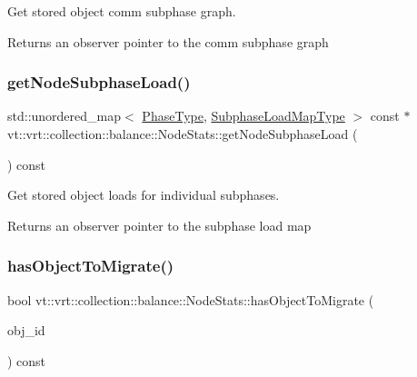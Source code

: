 Get stored object comm subphase graph. 

\begin{DoxyReturn}{Returns}
an observer pointer to the comm subphase graph 
\end{DoxyReturn}
\mbox{\label{structvt_1_1vrt_1_1collection_1_1balance_1_1_node_stats_a24660f52ff5e6a734a443ebbd1852519}} 
\subsubsection{\texorpdfstring{get\+Node\+Subphase\+Load()}{getNodeSubphaseLoad()}}
{\footnotesize\ttfamily std\+::unordered\+\_\+map$<$ \hyperlink{namespacevt_a46ce6733d5cdbd735d561b7b4029f6d7}{Phase\+Type}, \hyperlink{namespacevt_1_1vrt_1_1collection_1_1balance_a3d91523158c1025b7b665240072f3b7e}{Subphase\+Load\+Map\+Type} $>$ const  $\ast$ vt\+::vrt\+::collection\+::balance\+::\+Node\+Stats\+::get\+Node\+Subphase\+Load (\begin{DoxyParamCaption}{ }\end{DoxyParamCaption}) const}



Get stored object loads for individual subphases. 

\begin{DoxyReturn}{Returns}
an observer pointer to the subphase load map 
\end{DoxyReturn}
\mbox{\label{structvt_1_1vrt_1_1collection_1_1balance_1_1_node_stats_a06128ad9d9dff72bad160b015054b054}} 
\subsubsection{\texorpdfstring{has\+Object\+To\+Migrate()}{hasObjectToMigrate()}}
{\footnotesize\ttfamily bool vt\+::vrt\+::collection\+::balance\+::\+Node\+Stats\+::has\+Object\+To\+Migrate (\begin{DoxyParamCaption}\item[{\hyperlink{namespacevt_1_1vrt_1_1collection_1_1balance_a14c8d2c972f2913aa3f1636e5be0a120}{Element\+I\+D\+Type}}]{obj\+\_\+id }\end{DoxyParamCaption}) const}



